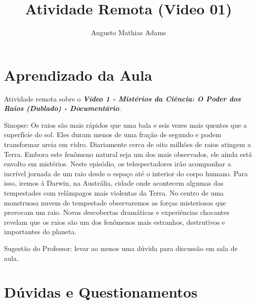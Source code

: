 \documentclass[a4paper, 12pt, onecolumn,singlespacing]{article}
\title{Atividade Remota (Video 01)}
\author[1]{Augusto Mathias Adams}
\affil[1]{augusto.adams@ufpr.br}
\begin{document}
	
	\maketitle
	
	\section{Aprendizado da Aula}
	
	Atividade remota sobre o \textbf{\textit{Vídeo 1 - Mistérios da Ciência: O Poder dos Raios (Dublado) - Documentário}}.
	
	Sinopse: Os raios são mais rápidos que uma bala e seis vezes mais quentes que a superfície do sol. Eles duram menos de uma fração de segundo e podem transformar areia em vidro. Diariamente cerca de oito milhões de raios atingem a Terra. Embora este fenômeno natural seja um dos mais observados, ele ainda está envolto em mistérios. Neste episódio, os telespectadores irão acompanhar a incrível jornada de um raio desde o espaço até o interior do corpo humano. Para isso, iremos à Darwin, na Austrália, cidade onde acontecem algumas das tempestades com relâmpagos mais violentas da Terra. No centro de uma monstruosa nuvem de tempestade observaremos as forças misteriosas que provocam um raio. Novas descobertas dramáticas e experiências chocantes revelam que os raios são um dos fenômenos mais estranhos, destrutivos e importantes do planeta.
	
	Sugestão do Professor: levar ao menos uma dúvida para discussão em sala de aula.
	
	\section{Dúvidas e Questionamentos}
	
\end{document}
